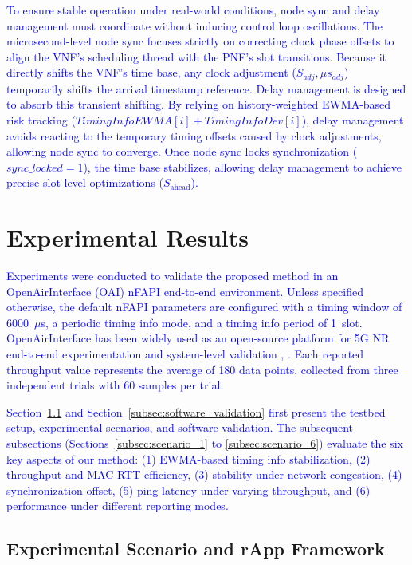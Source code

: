 \documentclass[10pt, conference, letterpaper]{IEEEtran}
\begin{document}
\textcolor{blue}{To ensure stable operation under real-world conditions, node sync and delay management must coordinate without inducing control loop oscillations. The microsecond-level node sync focuses strictly on correcting clock phase offsets to align the VNF's scheduling thread with the PNF's slot transitions. Because it directly shifts the VNF's time base, any clock adjustment ($S_{adj}, \mu s_{adj}$) temporarily shifts the arrival timestamp reference. Delay management is designed to absorb this transient shifting. By relying on history-weighted EWMA-based risk tracking ($\mathit{TimingInfoEWMA}[i] + \mathit{TimingInfoDev}[i]$), delay management avoids reacting to the temporary timing offsets caused by clock adjustments, allowing node sync to converge. Once node sync locks synchronization ($\mathit{sync\_locked} = 1$), the time base stabilizes, allowing delay management to achieve precise slot-level optimizations ($S_{\mathrm{ahead}}$).}

\section{Experimental Results}
\label{sec:experiments}

\textcolor{blue}{Experiments were conducted to validate the proposed method in an OpenAirInterface (OAI) nFAPI end-to-end environment. Unless specified otherwise, the default nFAPI parameters are configured with a timing window of 6000~$\mu$s, a periodic timing info mode, and a timing info period of 1~slot. OpenAirInterface has been widely used as an open-source platform for 5G NR end-to-end experimentation and system-level validation \cite{Ryu2022}, \cite{Wang2022}. Each reported throughput value represents the average of 180 data points, collected from three independent trials with 60 samples per trial.}

\textcolor{blue}{Section~\ref{subsec:experimental_scenario} and Section~\ref{subsec:software_validation} first present the testbed setup, experimental scenarios, and software validation. The subsequent subsections (Sections~\ref{subsec:scenario_1} to \ref{subsec:scenario_6}) evaluate the six key aspects of our method: (1) EWMA-based timing info stabilization, (2) throughput and MAC RTT efficiency, (3) stability under network congestion, (4) synchronization offset, (5) ping latency under varying throughput, and (6) performance under different reporting modes.}

\subsection{Experimental Scenario and rApp Framework}
\label{subsec:experimental_scenario}
\end{document}
